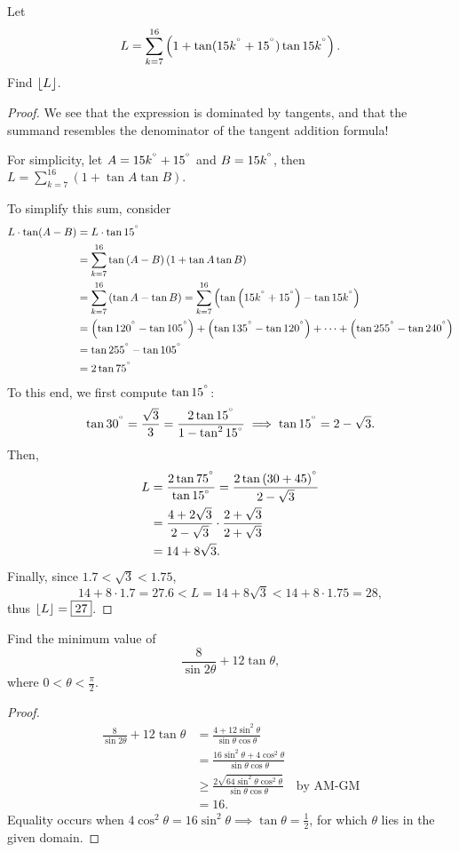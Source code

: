 \documentclass[../main.tex]{subfiles}
\begin{document}
\begin{example}[2018 SMO(S) P17]
    Let 
    $$L=\sum_{k=7}^{16}\left(1+\tan(15k^{^\circ}+15^{^\circ})\tan15k^{^\circ}\right).$$
    Find $\left\lfloor L \right\rfloor$.
\end{example}
\begin{proof}
    We see that the expression is dominated by tangents, and that the summand resembles the denominator of the tangent addition formula!

    For simplicity, let $A=15k^{^\circ}+15^{^\circ}$ and $B=15k^{^\circ}$, then $L=\sum_{k=7}^{16}\left(1+\tan{A}\tan{B}\right).$

    To simplify this sum, consider 
    \begin{align*}
        L\cdot\tan(A-B)&=L\cdot\tan 15^{^\circ}\\
        &=\sum_{k=7}^{16}\tan{(A-B)}\left(1+\tan{A}\tan{B}\right) \\
        &=\sum_{k=7}^{16} \left(\tan{A}-\tan{B}\right)=\sum_{k=7}^{16} \left(\tan{\left(15k^{^\circ}+15^{^\circ}\right)}-\tan{15k^{^\circ}}\right)\\
        &=\left(\tan{120^{^\circ}}-\tan{105^{^\circ}}\right)+\left(\tan{135^{^\circ}}-\tan{120^{^\circ}}\right)+\cdots+\left(\tan{255^{^\circ}}-\tan{240^{^\circ}}\right) \\
        &=\tan{255^{^\circ}}-\tan{105^{^\circ}} \\
        &=2\tan{75^{^\circ}}
    \end{align*}
    To this end, we first compute $\tan{15^{^\circ}}$:
    $$\tan{30^{^\circ}}=\frac{\sqrt{3}}{3}=\frac{2\tan{15^{^\circ}}}{1-\tan^2{15^{^\circ}}} \implies \tan{15^{^\circ}}=2-\sqrt{3}.$$
    Then, 
    \begin{align*}
        L&=\frac{2\tan{75^{^\circ}}}{\tan{15^{^\circ}}}=\frac{2\tan{(30+45)^{^\circ}}}{2-\sqrt{3}} \\
        &=\frac{4+2\sqrt{3}}{2-\sqrt{3}}\cdot\frac{2+\sqrt{3}}{2+\sqrt{3}}\\
        &=14+8\sqrt{3}.
    \end{align*}
    Finally, since $1.7<\sqrt{3}<1.75$,
    $$14+8\cdot1.7=27.6 < L=14+8\sqrt{3} < 14+8\cdot1.75=28,$$
    thus $\left\lfloor L \right\rfloor=\boxed{27}$.
\end{proof}

\begin{example}[2021 SMO(S) P15]
    Find the minimum value of $$\frac{8}{\sin{2\theta}}+12\tan{\theta},$$
    where $0<\theta<\frac{\pi}{2}.$
\end{example}
\begin{proof}
    \begin{align*}
        \frac{8}{\sin{2\theta}}+12\tan{\theta}&=\frac{4+12\sin^2{\theta}}{\sin{\theta}\cos{\theta}} \\
        &=\frac{16\sin^2{\theta}+4\cos^2{\theta}}{\sin{\theta}\cos{\theta}} \\
        &\geq \frac{2\sqrt{64\sin^2{\theta}\cos^2{\theta}}}{\sin{\theta}\cos{\theta}} \quad\text{by AM-GM}\\
        &=\boxed{16}.
    \end{align*}
    Equality occurs when $4\cos^2{\theta}=16\sin^2{\theta} \implies \tan{\theta}=\frac{1}{2}$, for which $\theta$ lies in the given domain.
\end{proof}
\end{document}
